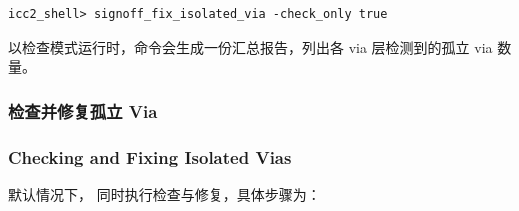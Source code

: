\begin{lstlisting}
icc2_shell> signoff_fix_isolated_via -check_only true
\end{lstlisting}

以检查模式运行时，命令会生成一份汇总报告，列出各 via 层检测到的孤立 via 数量。

\subsubsection{检查并修复孤立 Via}
\subsubsection*{Checking and Fixing Isolated Vias}

默认情况下， 同时执行检查与修复，具体步骤为：

